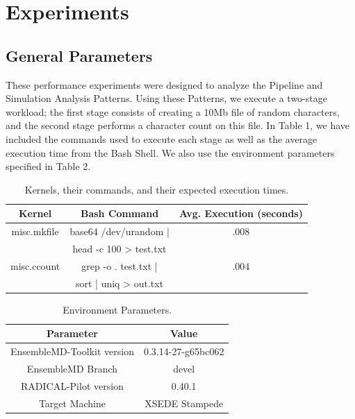 \documentclass[]{article}
\begin{document}
\section{Experiments}
	\subsection{General Parameters}
		These performance experiments were designed to analyze the Pipeline and Simulation Analysis Patterns. Using these Patterns, we execute a two-stage workload; the first stage consists of creating a 10Mb file of random characters, and the second stage performs a character count on this file. In Table 1, we have included the commands used to execute each stage as well as the average execution time from the Bash Shell. We also use the environment parameters specified in Table 2.

		\begin{table}[H]
			\centering
			\begin{tabu}{|c|c|c|}
				\hline
				Kernel & Bash Command & Avg. Execution (seconds) \\
				\hline
				misc.mkfile & base64 /dev/urandom | & .008 \\ 
							& head -c 100 > test.txt  \\
				\hline
				misc.ccount & grep -o . test.txt |  & .004\\ 
							& sort | uniq > out.txt   \\
				\hline
			\end{tabu}
			\caption{Kernels, their commands, and their expected execution times.}
			\label{table:kernel_execution_table}
		\end{table}

		\begin{table}[H]
			\centering
			\begin{tabular}{|c|c|}
					\hline
					Parameter & Value \\
					\hline
					\hline
					EnsembleMD-Toolkit version & 0.3.14-27-g65bc062 \\
					\hline
					EnsembleMD Branch & devel \\
					\hline
					RADICAL-Pilot version & 0.40.1 \\
					\hline
					Target Machine & XSEDE Stampede \\
					\hline
			\end{tabular}
			\caption{Environment Parameters.}
			\label{table:environment_variables}
		\end{table}
\end{document}
